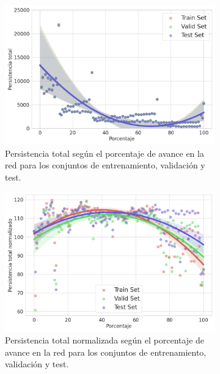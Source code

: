 \begin{figure}[H]
	\centering
	\begin{subfigure}
		{.45\textwidth}
		\centering
		\includegraphics[width=\linewidth]{img/mm_set_base.png}
		\caption{Persistencia total según el porcentaje de avance en la red para los
			conjuntos de entrenamiento, validación y test.}
		\label{fig:mm_set_base}
	\end{subfigure}
	\begin{subfigure}
		{.45\textwidth}
		\centering
		\includegraphics[width=\linewidth]{img/mm_set_base_norm.png}
		\caption{Persistencia total normalizada según el porcentaje de avance en la
			red para los conjuntos de entrenamiento, validación y test.}
		\label{fig:mm_set_base_norm}
	\end{subfigure}
	\begin{subfigure}
		{.45\textwidth}
		\centering

\end{subfigure}
\end{figure}
